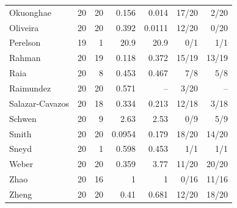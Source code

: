 \begin{longtable}{@{}lrrrrrr@{}}
Okuonghae & 20 & 20 & 0.156 & 0.014 & 17/20 & 2/20 \\
Oliveira & 20 & 20 & 0.392 & 0.0111 & 12/20 & 0/20 \\
Perelson & 19 & 1 & 20.9 & 20.9 & 0/1 & 1/1 \\
Rahman & 20 & 19 & 0.118 & 0.372 & 15/19 & 13/19 \\
Raia & 20 & 8 & 0.453 & 0.467 & 7/8 & 5/8 \\
Raimundez & 20 & 20 & 0.571 & -- & 3/20 & -- \\
Salazar-Cavazos & 20 & 18 & 0.334 & 0.213 & 12/18 & 3/18 \\
Schwen & 20 & 9 & 2.63 & 2.53 & 0/9 & 5/9 \\
Smith & 20 & 20 & 0.0954 & 0.179 & 18/20 & 14/20 \\
Sneyd & 20 & 1 & 0.598 & 0.453 & 1/1 & 1/1 \\
Weber & 20 & 20 & 0.359 & 3.77 & 11/20 & 20/20 \\
Zhao & 20 & 16 & 1 & 1 & 0/16 & 11/16 \\
Zheng & 20 & 20 & 0.41 & 0.681 & 12/20 & 18/20 \\
\bottomrule
\end{longtable}
